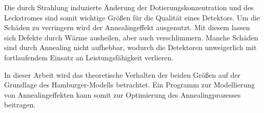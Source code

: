 Die durch Strahlung induzierte Änderung der Dotierungskonzentration und des Leckstromes sind
somit wichtige Größen für die Qualität eines Detektors.
Um die Schäden zu verringern wird der Annealingeffekt ausgenutzt. Mit diesem lassen
sich Defekte durch Wärme ausheilen, aber auch verschlimmern.
Manche Schäden sind durch Annealing nicht
aufhebbar, wodurch die Detektoren unweigerlich mit fortlaufendem Einsatz
an Leistungsfähigkeit verlieren.

In dieser Arbeit wird das
theoretische Verhalten der beiden Größen auf der Grundlage des Hamburger-Modells betrachtet.
Ein Programm zur Modellierung von Annealingeffekten kann somit zur
Optimierung des Annealingprozesses beitragen.

